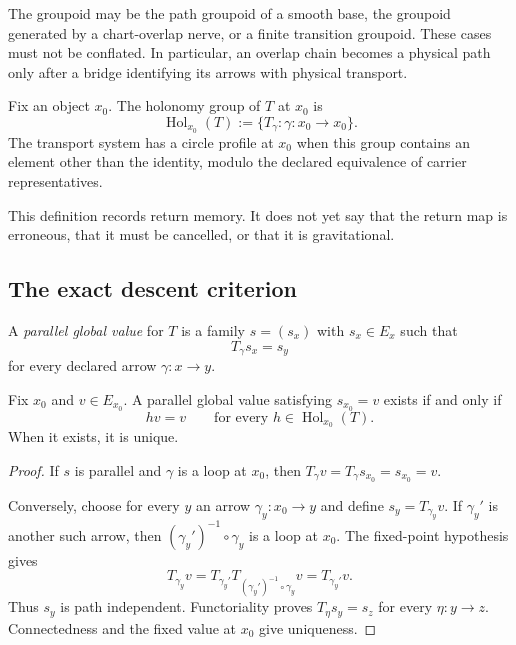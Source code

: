 \documentclass[11pt]{article}
\newcommand{\Hol}{\operatorname{Hol}}
\begin{document}
The groupoid may be the path groupoid of a smooth base, the groupoid generated
by a chart-overlap nerve, or a finite transition groupoid.  These cases must
not be conflated.  In particular, an overlap chain becomes a physical path
only after a bridge identifying its arrows with physical transport.

\begin{definition}\label{def:holonomy}
Fix an object $x_0$.  The holonomy group of $T$ at $x_0$ is
\[
 \Hol_{x_0}(T)
 :=\{T_\gamma:\gamma:x_0\to x_0\}.
\]
The transport system has a circle profile at $x_0$ when this group contains an
element other than the identity, modulo the declared equivalence of carrier
representatives.
\end{definition}

This definition records return memory.  It does not yet say that the return
map is erroneous, that it must be cancelled, or that it is gravitational.

\subsection{The exact descent criterion}

\begin{definition}
A \emph{parallel global value} for $T$ is a family $s=(s_x)$ with
$s_x\in E_x$ such that
\[
 T_\gamma s_x=s_y
\]
for every declared arrow $\gamma:x\to y$.
\end{definition}

\begin{theorem}\label{thm:fixed-descent}
Fix $x_0$ and $v\in E_{x_0}$.  A parallel global value satisfying
$s_{x_0}=v$ exists if and only if
\[
 h v=v\qquad\text{for every }h\in\Hol_{x_0}(T).
\]
When it exists, it is unique.
\end{theorem}

\begin{proof}
If $s$ is parallel and $\gamma$ is a loop at $x_0$, then
$T_\gamma v=T_\gamma s_{x_0}=s_{x_0}=v$.

Conversely, choose for every $y$ an arrow $\gamma_y:x_0\to y$ and define
$s_y=T_{\gamma_y}v$.  If $\gamma_y'$ is another such arrow, then
$(\gamma_y')^{-1}\circ\gamma_y$ is a loop at $x_0$.  The fixed-point
hypothesis gives
\[
 T_{\gamma_y}v
 =T_{\gamma_y'}T_{(\gamma_y')^{-1}\circ\gamma_y}v
 =T_{\gamma_y'}v.
\]
Thus $s_y$ is path independent.  Functoriality proves
$T_\eta s_y=s_z$ for every $\eta:y\to z$.  Connectedness and the fixed value
at $x_0$ give uniqueness.
\end{proof}
\end{document}
